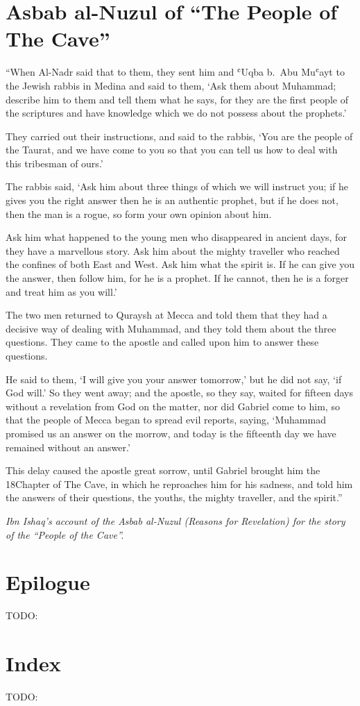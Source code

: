 \documentclass[12pt]{memoir}
\def\`{ʿ} %
\def\–{-\hskip0pt}
\newcommand{\QRef}[1]{{\color{darkblue}#1}}
\begin{document}
\clearpage
\appendix
\addappheadtotoc

\chapter{Asbab al\–Nuzul of “The People of The Cave”}
\label{apdx:cave}

“When Al\–Nadr said that to them, they sent him and \`Uqba b.\ Abu Mu\`ayt
to the Jewish rabbis in Medina and said to them, ‘Ask them about Muhammad;
describe him to them and tell them what he says,
for they are the first people of the scriptures
and have knowledge which we do not possess about the prophets.’

They carried out their instructions, and said to the rabbis,
‘You are the people of the Taurat, and we have come to you
so that you can tell us how to deal with this tribesman of ours.’

The rabbis said, ‘Ask him about three things of which we will instruct you;
if he gives you the right answer then he is an authentic prophet,
but if he does not, then the man is a rogue,
so form your own opinion about him.

Ask him what happened to the young men who disappeared in ancient days,
for they have a marvellous story.
Ask him about the mighty traveller
who reached the confines of both East and West.
Ask him what the spirit is.
If he can give you the answer, then follow him, for he is a prophet.
If he cannot, then he is a forger and treat him as you will.’

The two men returned to Quraysh at Mecca and told them
that they had a decisive way of dealing with Muhammad,
and they told them about the three questions.
They came to the apostle and called upon him to answer these questions.

He said to them, ‘I will give you your answer tomorrow,’
but he did not say, ‘if God will.’
So they went away; and the apostle, so they say,
waited for fifteen days without a revelation from God on the matter,
nor did Gabriel come to him, so that the people of Mecca
began to spread evil reports, saying,
‘Muhammad promised us an answer on the morrow,
and today is the fifteenth day we have remained without an answer.’

This delay caused the apostle great sorrow,
until Gabriel brought him the \QRef{18}{Chapter of The Cave},
in which he reproaches him for his sadness,
and told him the answers of their questions, the youths,
the mighty traveller, and the spirit.”

\emph{Ibn Ishaq's account of the Asbab al\–Nuzul
(Reasons for Revelation) for the story of the “People of the Cave”.}


\backmatter

\chapter{Epilogue}
TODO:

\chapter{Index}
TODO:
\end{document}
